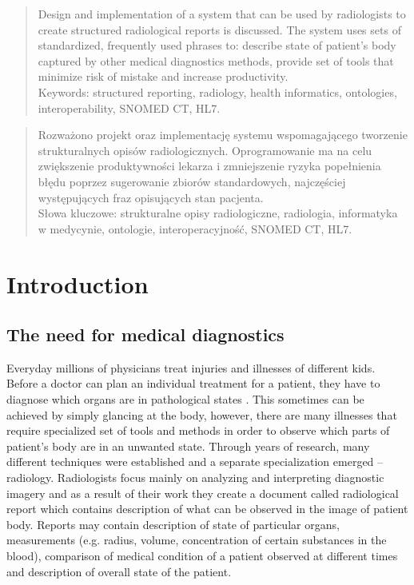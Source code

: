 \documentclass[12pt, twoside, openany]{report}
\theoremstyle{definition}
\begin{document}
\thispagestyle{empty}
\newpage
\pagestyle{headings}
\setcounter{page}{1}
\begin{otherlanguage}{british}
\begin{abstract}
Design and implementation of a system that can be used by radiologists to create structured radiological reports is discussed. The system uses sets of standardized, frequently used phrases to: describe state of patient's body captured by other medical diagnostics methods, provide set of tools that minimize risk of mistake and increase productivity. 
\\
Keywords: structured reporting, radiology, health informatics, ontologies, interoperability, SNOMED CT, HL7.
\end{abstract}
\end{otherlanguage}
\begin{otherlanguage}{polish}
\begin{abstract}
	Rozważono projekt oraz implementację systemu wspomagającego tworzenie strukturalnych opisów radiologicznych. Oprogramowanie ma na celu zwiększenie produktywności lekarza i zmniejszenie ryzyka popełnienia błędu poprzez sugerowanie zbiorów standardowych, najczęściej występujących fraz opisujących stan pacjenta.
\\
Słowa kluczowe: strukturalne opisy radiologiczne, radiologia, informatyka w medycynie, ontologie, interoperacyjność, SNOMED CT, HL7.

\end{abstract}
\end{otherlanguage}

\tableofcontents
\clearpage







\chapter{Introduction}
\section{The need for medical diagnostics}
Everyday millions of physicians treat injuries and illnesses of different kids. Before a doctor can plan an individual treatment for a patient, they have to diagnose which organs are in pathological states \cite{bls}. This sometimes can be achieved by simply glancing at the body, however, there are many illnesses that require specialized set of tools and methods in order to observe which parts of patient's body are in an unwanted state. Through years of research, many different techniques were established and a separate specialization emerged -- radiology. Radiologists focus mainly on analyzing and interpreting diagnostic imagery and as a result of their work they create a document called radiological report which contains description of what can be observed in the image of patient body. Reports may contain description of state of particular organs, measurements (e.g. radius, volume, concentration of certain substances in the blood), comparison of medical condition of a patient observed at different times and description of overall state of the patient.
\end{document}
